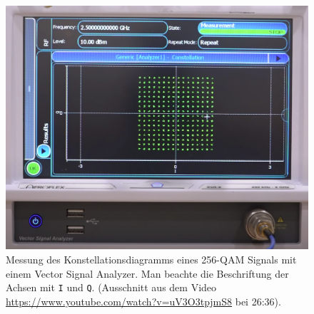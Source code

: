\begin{figure}
\centering
\includegraphics[width=1.0\hsize]{applications/qam/images/analyzer.png}
\caption{Messung des Konstellationsdiagramms eines 256-QAM Signals
mit einem Vector Signal Analyzer.
Man beachte die Beschriftung der Achsen mit \texttt{I} und \texttt{Q}.
(Ausschnitt aus dem Video \url{https://www.youtube.com/watch?v=uV3O3tpjmS8}
bei 26:36).
\label{figure:qam:analyzer}}
\end{figure}

